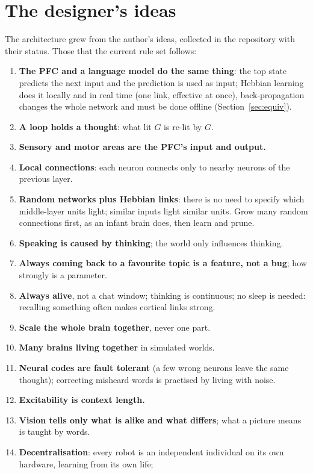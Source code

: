 \documentclass[11pt]{article}
\begin{document}
\appendix

\section{The designer's ideas}\label{app:ideas}
The architecture grew from the author's ideas, collected in the repository with their status. Those that the current
rule set follows:
\begin{enumerate}
\item \textbf{The PFC and a language model do the same thing}: the top state predicts the next input and the prediction is
used as input; Hebbian learning does it locally and in real time (one link, effective at once), back-propagation changes
the whole network and must be done offline (Section~\ref{sec:equiv}).
\item \textbf{A loop holds a thought}: what lit $G$ is re-lit by $G$.
\item \textbf{Sensory and motor areas are the PFC's input and output.}
\item \textbf{Local connections}: each neuron connects only to nearby neurons of the previous layer.
\item \textbf{Random networks plus Hebbian links}: there is no need to specify which middle-layer units light; similar
inputs light similar units. Grow many random connections first, as an infant brain does, then learn and prune.
\item \textbf{Speaking is caused by thinking}; the world only influences thinking.
\item \textbf{Always coming back to a favourite topic is a feature, not a bug}; how strongly is a parameter.
\item \textbf{Always alive}, not a chat window; thinking is continuous; no sleep is needed: recalling something often makes
cortical links strong.
\item \textbf{Scale the whole brain together}, never one part.
\item \textbf{Many brains living together} in simulated worlds.
\item \textbf{Neural codes are fault tolerant} (a few wrong neurons leave the same thought); correcting misheard words is
practised by living with noise.
\item \textbf{Excitability is context length.}
\item \textbf{Vision tells only what is alike and what differs}; what a picture means is taught by words.
\item \textbf{Decentralisation}: every robot is an independent individual on its own hardware, learning from its own life;

\end{enumerate}
\end{document}
